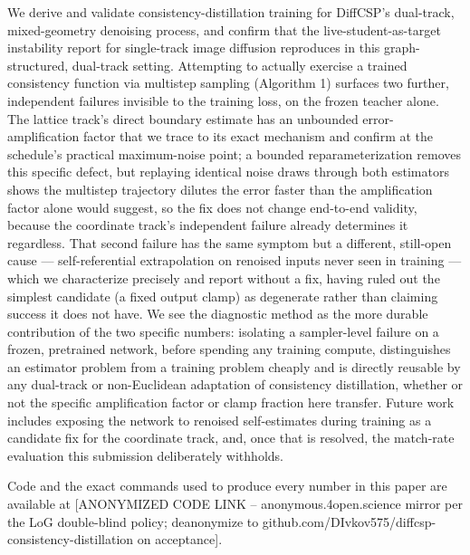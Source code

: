 \documentclass{article}
\begin{document}
We derive and validate consistency-distillation training for DiffCSP's dual-track, mixed-geometry denoising process, and confirm that the live-student-as-target instability \citet{Song:2023cm} report for single-track image diffusion reproduces in this graph-structured, dual-track setting. Attempting to actually exercise a trained consistency function via multistep sampling (Algorithm 1) surfaces two further, independent failures invisible to the training loss, on the frozen teacher alone. The lattice track's direct boundary estimate has an unbounded error-amplification factor that we trace to its exact mechanism and confirm at the schedule's practical maximum-noise point; a bounded reparameterization removes this specific defect, but replaying identical noise draws through both estimators shows the multistep trajectory dilutes the error faster than the amplification factor alone would suggest, so the fix does not change end-to-end validity, because the coordinate track's independent failure already determines it regardless. That second failure has the same symptom but a different, still-open cause --- self-referential extrapolation on renoised inputs never seen in training --- which we characterize precisely and report without a fix, having ruled out the simplest candidate (a fixed output clamp) as degenerate rather than claiming success it does not have. We see the diagnostic method as the more durable contribution of the two specific numbers: isolating a sampler-level failure on a frozen, pretrained network, before spending any training compute, distinguishes an estimator problem from a training problem cheaply and is directly reusable by any dual-track or non-Euclidean adaptation of consistency distillation, whether or not the specific amplification factor or clamp fraction here transfer. Future work includes exposing the network to renoised self-estimates during training as a candidate fix for the coordinate track, and, once that is resolved, the match-rate evaluation this submission deliberately withholds.

Code and the exact commands used to produce every number in this paper are available at [ANONYMIZED CODE LINK -- anonymous.4open.science mirror per the LoG double-blind policy; deanonymize to github.com/DIvkov575/diffcsp-consistency-distillation on acceptance].



\end{document}
